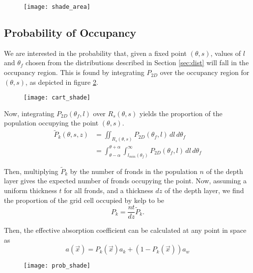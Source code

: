 \begin{figure}[h]
	\centering
	\texttt{[image: shade\_area]}
	\vspace{-2em}
	\label{fig:shade_area}
\end{figure}

\subsection{Probability of Occupancy}
We are interested in the probability that, given a fixed point $(\theta,s)$, values of $l$ and $\theta_f$ chosen from the distributions described in Section \ref{sec:dist} will fall in the occupancy region.
This is found by integrating $P_{2D}$ over the occupancy region for $(\theta,s)$, as depicted in figure \ref{fig:cart_shade}.

\begin{figure}[H]
	\centering
	\texttt{[image: cart\_shade]}
	\vspace{-3em}
	\label{fig:cart_shade}
\end{figure}

Now, integrating $P_{2D}(\theta_f,l)$ over $R_s(\theta,s)$ yields the proportion of the population occupying the point $(\theta,s)$.
\begin{align}
		\tilde{P}_k(\theta,s,z)	&= \iint_{R_s(\theta,s)}
								P_{2D}(\theta_f,l)
								\,dl\,d\theta_f \nonumber \\
							&= \int_{\theta-\alpha}^{\theta+\alpha} 
								\int_{l_{min}(\theta_f)}^\infty
								P_{2D}(\theta_f,l)
								\,dl\,d\theta_f
\end{align}

Then, multiplying $\tilde{P}_k$ by the number of fronds in the population $n$ of the depth layer gives the expected number of fronds occupying the point.
Now, assuming a uniform thickness $t$ for all fronds, and a thickness $dz$ of the depth layer, we find the proportion of the grid cell occupied by kelp to be
\begin{equation}
  P_k = \frac{nt}{dz}\tilde{P}_k.
\end{equation}

Then, the effective absorption coefficient can be calculated at any point in space as
\begin{equation}
  a(\vec{x}) = P_k(\vec{x})a_k + (1-P_k(\vec{x}))a_w
\end{equation}

\begin{figure}[h]
	\centering
	\texttt{[image: prob\_shade]}
	\vspace{-2em}
	\label{fig:prob_shade}
\end{figure}
